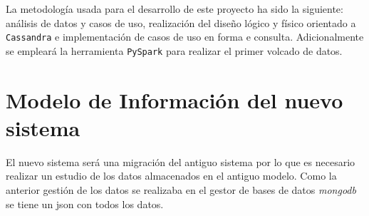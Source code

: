\documentclass[]{article}
\begin{document}
La metodología usada para el desarrollo de este proyecto ha sido la siguiente:
análisis de datos y casos de uso, realización del diseño lógico y físico
orientado a \texttt{Cassandra} e implementación de casos de uso en forma e
consulta. Adicionalmente se empleará la herramienta \texttt{PySpark} para
realizar el primer volcado de datos.
% 

\section{Modelo de Información del nuevo sistema}
\label{sec:modelo_informacion}

El nuevo sistema será una migración del antiguo sistema por lo que es necesario realizar un estudio de los datos almacenados en el antiguo modelo. Como la anterior gestión de los datos se realizaba en el gestor de bases de datos \textit{mongodb} se tiene un json con todos los datos.
\end{document}
